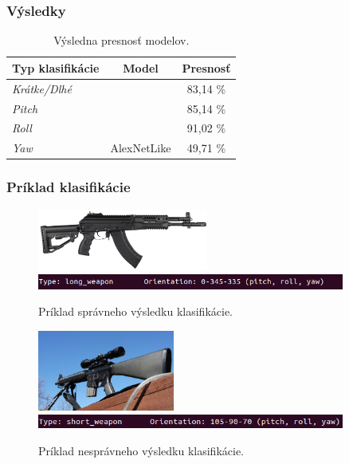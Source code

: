 \documentclass[10pt,xcolor=pdflatex]{beamer}
\begin{document}
\begin{frame}\frametitle{Výsledky}
    \begin{table}
        \begin{tabular}{ l | c | c }
            \textbf{Typ klasifikácie}   & \textbf{Model}                    & \textbf{Presnosť}   \\
            \hline
            \textit{Krátke/Dlhé}    &                                   & {83,14 \%}           \\
            \textit{Pitch}          &                                   & {85,14 \%}           \\
            \textit{Roll}           &                                   & {91,02 \%}           \\
            \textit{Yaw}            & \multirow{-4}{*}{AlexNetLike}     & {49,71 \%}
        \end{tabular}
        \caption{Výsledna presnosť modelov.}
    \end{table}

    

\end{frame}

\begin{frame}\frametitle{Príklad klasifikácie}
    \begin{figure}[H]
        \centering
        \includegraphics[width=0.5\textwidth]{img/prediction-weapon}
        \includegraphics[width=0.9\textwidth]{img/result-prediction}
        \caption{Príklad správneho výsledku klasifikácie.}
    \end{figure}

    \begin{figure}[H]
        \centering
        \includegraphics[width=0.4\textwidth]{img/weapon_2023}
        \includegraphics[width=0.9\textwidth]{img/class_bad}
        \caption{Príklad nesprávneho výsledku klasifikácie.}
    \end{figure}

\end{frame}
\end{document}
